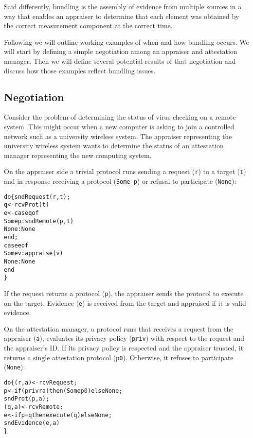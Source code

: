 \documentclass[10pt]{article}
\begin{document}
Said differently, bundling is the assembly of evidence from multiple
sources in a way that enables an appraiser to determine that each
element was obtained by the correct measurement component at the
correct time.

Following we will outline working examples of when and how bundling
occurs.  We will start by defining a simple negotiation among an
appraiser and attestation manager.  Then we will define several
potential results of that negotiation and discuss how those examples
reflect bundling issues.

\subsection*{Negotiation}

Consider the problem of determining the status of virus checking on a
remote system.  This might occur when a new computer is asking to join
a controlled network such as a university wireless system.  The
appraiser representing the university wireless system wants to
determine the status of an attestation manager representing the new
computing system.

On the appraiser side a trivial protocol runs sending a request
(\Verb+r+) to a target (\Verb+t+) and in response receiving a protocol
(\Verb+Some p+) or refusal to participate (\Verb+None+):

\begin{alltt}
  do \{ sndRequest(r,t);
       q <- rcvProt(t)
       e <- case q of
              Some p : sndRemote(p,t)
              None : None
            end;
       case e of 
         Some v : appraise(v)
         None : None
       end
  \}
\end{alltt}

If the request returns a protocol (\Verb+p+), the appraiser sends the
protocol to execute on the target. Evidence (\Verb+e+) is received
from the target and appraised if it is valid evidence.

On the attestation manager, a protocol runs that receives a request
from the appraiser (\Verb+a+), evaluates its privacy policy
(\Verb+priv+) with respect to the request and the appraiser's ID.  If
its privacy policy is respected and the appraiser trusted, it returns
a single attestation protocol (\Verb+p0+).  Otherwise, it refuses to
participate (\Verb+None+):

\begin{alltt}
  do \{ (r,a) <- rcvRequest;
       p <- if (priv r a) then (Some p0) else None;
       sndProt(p,a);
       (q,a) <- rcvRemote;
       e <- if p=q then execute(q) else None;
       sndEvidence(e,a)
  \}
\end{alltt}
\end{document}
